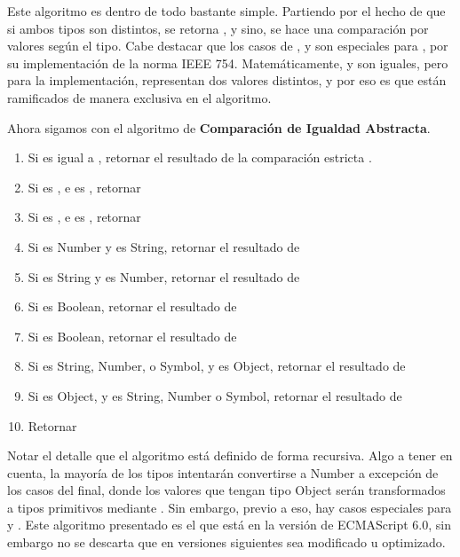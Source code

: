 Este algoritmo es dentro de todo bastante simple. Partiendo por el hecho de que si ambos tipos son distintos, se retorna , y sino, se hace una comparación por valores según el tipo. 
Cabe destacar que los casos de ,  y  son especiales para , por su implementación de la norma IEEE 754. Matemáticamente,  y  son iguales, pero para la implementación, representan dos valores distintos, y por eso es que están ramificados de manera exclusiva en el algoritmo.

Ahora sigamos con el algoritmo de \textbf{Comparación de Igualdad Abstracta}.

\begin{enumerate}
\item Si  es igual a , retornar el resultado de la comparación estricta .
\item Si  es , e  es , retornar 
\item Si  es , e  es , retornar 
\item Si  es Number y  es String, retornar el resultado de 
\item Si  es String y  es Number, retornar el resultado de 
\item Si  es Boolean, retornar el resultado de 
\item Si  es Boolean, retornar el resultado de 
\item Si  es String, Number, o Symbol, y  es Object, retornar el resultado de 
\item Si  es Object, y  es String, Number o Symbol, retornar el resultado de 
\item Retornar 
\end{enumerate}

Notar el detalle que el algoritmo está definido de forma recursiva. Algo a tener en cuenta, la mayoría de los tipos intentarán convertirse a Number a excepción de los casos del final, donde los valores que tengan tipo Object serán transformados a tipos primitivos mediante . Sin embargo, previo a eso, hay casos especiales para  y . Este algoritmo presentado es el que está en la versión de ECMAScript 6.0, sin embargo no se descarta que en versiones siguientes sea modificado u optimizado.

